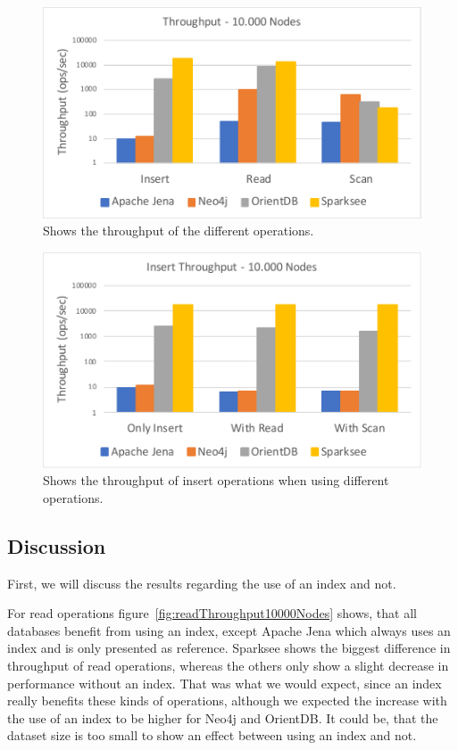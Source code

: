 \begin{figure}[h!]
  \centering
  \includegraphics[width=.75\textwidth]{images/responsiveness/operationReadScan}
  \caption{Shows the throughput of the different operations.}
  \label{fig:operationReadScan}
\end{figure}

\begin{figure}[h!]
  \centering
  \includegraphics[width=.75\textwidth]{images/responsiveness/insertWithWithoutReadScan}
  \caption{Shows the throughput of insert operations when using different operations.}
  \label{fig:insertWithWithoutReadScan}
\end{figure}

\subsection{Discussion}
First,
we will discuss the results regarding the use of an index and not.

For read operations figure~\ref{fig:readThroughput10000Nodes} shows,
that all databases benefit from using an index,
except Apache Jena which always uses an index and is only presented as reference.
Sparksee shows the biggest difference in throughput of read operations,
whereas the others only show a slight decrease in performance without an index.
That was what we would expect,
since an index really benefits these kinds of operations,
although we expected the increase with the use of an index to be higher for Neo4j and OrientDB.
It could be,
that the dataset size is too small to show an effect between using an index and not.

